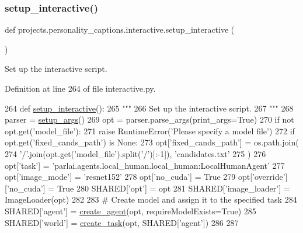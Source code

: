 \subsubsection{\texorpdfstring{setup\+\_\+interactive()}{setup\_interactive()}}
{\footnotesize\ttfamily def projects.\+personality\+\_\+captions.\+interactive.\+setup\+\_\+interactive (\begin{DoxyParamCaption}{ }\end{DoxyParamCaption})}

\begin{DoxyVerb}Set up the interactive script.
\end{DoxyVerb}
 

Definition at line 264 of file interactive.\+py.


\begin{DoxyCode}
264 \textcolor{keyword}{def }\hyperlink{namespaceprojects_1_1personality__captions_1_1interactive_aa5144adf4092cfa1c2dc076d766226a1}{setup\_interactive}():
265     \textcolor{stringliteral}{"""}
266 \textcolor{stringliteral}{    Set up the interactive script.}
267 \textcolor{stringliteral}{    """}
268     parser = \hyperlink{namespaceprojects_1_1self__feeding_1_1interactive_a2ad3b874d9caef6e76ea41e029b933f0}{setup\_args}()
269     opt = parser.parse\_args(print\_args=\textcolor{keyword}{True})
270     \textcolor{keywordflow}{if} \textcolor{keywordflow}{not} opt.get(\textcolor{stringliteral}{'model\_file'}):
271         \textcolor{keywordflow}{raise} RuntimeError(\textcolor{stringliteral}{'Please specify a model file'})
272     \textcolor{keywordflow}{if} opt.get(\textcolor{stringliteral}{'fixed\_cands\_path'}) \textcolor{keywordflow}{is} \textcolor{keywordtype}{None}:
273         opt[\textcolor{stringliteral}{'fixed\_cands\_path'}] = os.path.join(
274             \textcolor{stringliteral}{'/'}.join(opt.get(\textcolor{stringliteral}{'model\_file'}).split(\textcolor{stringliteral}{'/'})[:-1]), \textcolor{stringliteral}{'candidates.txt'}
275         )
276     opt[\textcolor{stringliteral}{'task'}] = \textcolor{stringliteral}{'parlai.agents.local\_human.local\_human:LocalHumanAgent'}
277     opt[\textcolor{stringliteral}{'image\_mode'}] = \textcolor{stringliteral}{'resnet152'}
278     opt[\textcolor{stringliteral}{'no\_cuda'}] = \textcolor{keyword}{True}
279     opt[\textcolor{stringliteral}{'override'}][\textcolor{stringliteral}{'no\_cuda'}] = \textcolor{keyword}{True}
280     SHARED[\textcolor{stringliteral}{'opt'}] = opt
281     SHARED[\textcolor{stringliteral}{'image\_loader'}] = ImageLoader(opt)
282 
283     \textcolor{comment}{# Create model and assign it to the specified task}
284     SHARED[\textcolor{stringliteral}{'agent'}] = \hyperlink{namespaceparlai_1_1core_1_1agents_a00d77a7e26fb89e8bd900f7b2a02982a}{create\_agent}(opt, requireModelExists=\textcolor{keyword}{True})
285     SHARED[\textcolor{stringliteral}{'world'}] = \hyperlink{namespaceparlai_1_1core_1_1worlds_a79969c7ba76d4b3c500f5bb776444dc6}{create\_task}(opt, SHARED[\textcolor{stringliteral}{'agent'}])
286 
287 
\end{DoxyCode}


